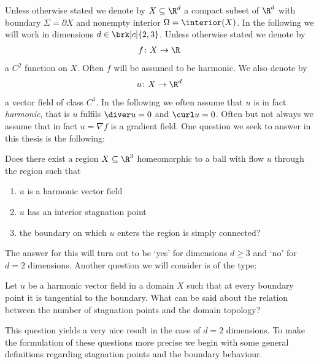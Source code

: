 Unless otherwise stated we denote by $X\subseteq\R^d$ a compact subset of $\R^d$ with boundary $\Sigma=\partial X$ and nonempty interior
$\Omega=\interior(X)$.
In the following we will work in dimensions $d\in\brk[c]{2,3}$.
Unless otherwise stated we denote by
\begin{align*}
  f\colon X\to\R
\end{align*}
a $C^2$ function on $X$. Often $f$ will be assumed to be harmonic.
We also denote by
\begin{align*}
  u\colon X\to\R^d
\end{align*}
a vector field of class $C^1$.
In the following we often assume that $u$ is in fact \emph{harmonic}, that is $u$ fulfils
$\diver u=0$ and $\curl u=0$.
Often but not always we assume that in fact $u=\nabla f$ is a gradient field.
One question we seek to answer in this thesis is the following:
\begin{question}\label{qu:flowthroughStagnationPoint}
  Does there exist a region $X\subseteq\R^3$ homeomorphic to a ball with flow $u$ through the region such that
  \begin{enumerate}
    \item $u$ is a harmonic vector field
    \item $u$ has an interior stagnation point
    \item the boundary on which $u$ enters the region is simply connected?
  \end{enumerate}
\end{question}
The answer for this will turn out to be `yes' for dimensions $d\geq3$ and `no' for $d=2$ dimensions.
Another question we will consider is of the type:
\begin{question}
  Let $u$ be a harmonic vector field in a domain $X$ such that at every boundary point it is tangential to the boundary.
  What can be said about the relation between the number of stagnation points and the domain topology?
\end{question}
This question yields a very nice result in the case of $d=2$ dimensions.
To make the formulation of these questions more precise we begin with some general definitions regarding stagnation points and the boundary behaviour.


